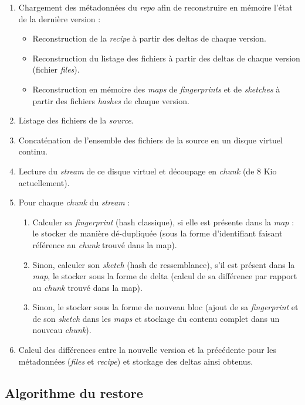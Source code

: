 \documentclass[a4paper,twocolumn]{article}
\begin{document}
\begin{enumerate}
\item
  Chargement des métadonnées du \emph{repo} afin de reconstruire en
  mémoire l'état de la dernière version :

  \begin{itemize}
  \item
    Reconstruction de la \emph{recipe} à partir des deltas de chaque
    version.
  \item
    Reconstruction du listage des fichiers à partir des deltas de chaque
    version (fichier \emph{files}).
  \item
    Reconstruction en mémoire des \emph{maps} de \emph{fingerprints} et
    de \emph{sketches} à partir des fichiers \emph{hashes} de chaque
    version.
  \end{itemize}
\item
  Listage des fichiers de la \emph{source}.
\item
  Concaténation de l'ensemble des fichiers de la source en un disque
  virtuel continu.
\item
  Lecture du \emph{stream} de ce disque virtuel et découpage en
  \emph{chunk} (de 8 Kio actuellement).
\item
  Pour chaque \emph{chunk} du \emph{stream} :

  \begin{enumerate}
  \item
    Calculer sa \emph{fingerprint} (hash classique), si elle est
    présente dans la \emph{map} : le stocker de manière dé-dupliquée
    (sous la forme d'identifiant faisant référence au \emph{chunk}
    trouvé dans la map).
  \item
    Sinon, calculer son \emph{sketch} (hash de ressemblance), s'il est
    présent dans la \emph{map}, le stocker sous la forme de delta
    (calcul de sa différence par rapport au \emph{chunk} trouvé dans la
    map).
  \item
    Sinon, le stocker sous la forme de nouveau bloc (ajout de sa
    \emph{fingerprint} et de son \emph{sketch} dans les \emph{maps} et
    stockage du contenu complet dans un nouveau \emph{chunk}).
  \end{enumerate}
\item
  Calcul des différences entre la nouvelle version et la précédente pour
  les métadonnées (\emph{files} et \emph{recipe}) et stockage des deltas
  ainsi obtenus.
\end{enumerate}

\subsection{Algorithme du restore}
\end{document}
